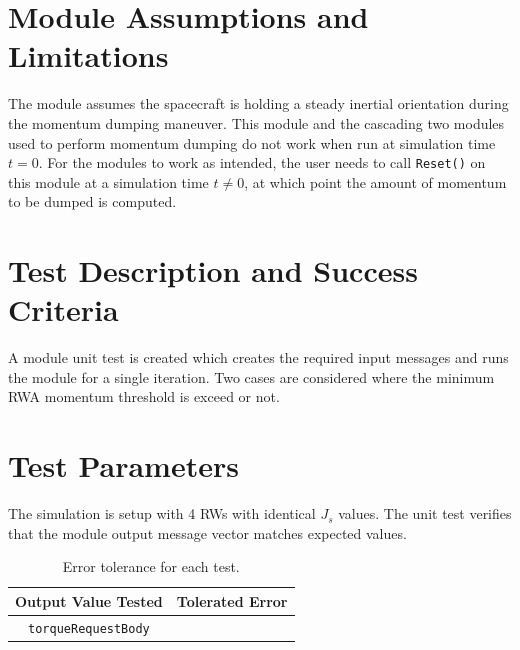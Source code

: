 \documentclass[]{BasiliskReportMemo}
\begin{document}
\section{Module Assumptions and Limitations}
The module assumes the spacecraft is holding a steady inertial orientation during the momentum dumping maneuver. This module and the cascading two modules used to perform momentum dumping do not work when run at simulation time $t=0$. For the modules to work as intended, the user needs to call \texttt{Reset()} on this module at a simulation time $t \neq 0$, at which point the amount of momentum to be dumped is computed.








\section{Test Description and Success Criteria}
A module unit test is created which creates the required input messages and runs the module for a single iteration.  Two cases are considered where the minimum RWA momentum threshold is exceed or not.




\section{Test Parameters}
The simulation is setup with 4  RWs with identical $J_{s}$ values.  
The unit test verifies that the module output  message vector matches expected values.
\begin{table}[htbp]
	\caption{Error tolerance for each test.}
	\label{tab:errortol}
	\centering \fontsize{10}{10}\selectfont
	\begin{tabular}{ c | c } %
		\hline\hline
		\textbf{Output Value Tested}  & \textbf{Tolerated Error}  \\ 
		\hline
		{\tt torqueRequestBody}        & 	   \\ 
		\hline\hline
	\end{tabular}
\end{table}
\end{document}

